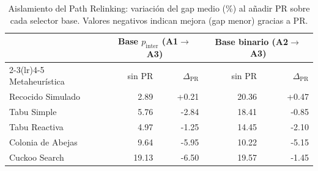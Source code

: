 \begin{table}[htbp]\centering
\caption{Aislamiento del Path Relinking: variaci\'on del gap medio (\%) al a\~nadir PR sobre cada selector base. Valores negativos indican mejora (gap menor) gracias a PR.}
\label{tab:efecto-pr}
\begin{tabular}{l rr rr}
\toprule
& \multicolumn{2}{c}{Base $p_{\text{inter}}$ (A1$\to$A3)} & \multicolumn{2}{c}{Base binario (A2$\to$A3)} \\
\cmidrule(lr){2-3}\cmidrule(lr){4-5}
Metaheur\'istica & sin PR & $\Delta_{\text{PR}}$ & sin PR & $\Delta_{\text{PR}}$ \\
\midrule
Recocido Simulado & 2.89 & +0.21 & 20.36 & +0.47 \\
Tabu Simple & 5.76 & -2.84 & 18.41 & -0.85 \\
Tabu Reactiva & 4.97 & -1.25 & 14.45 & -2.10 \\
Colonia de Abejas & 9.64 & -5.95 & 10.22 & -5.15 \\
Cuckoo Search & 19.13 & -6.50 & 19.57 & -1.45 \\
\bottomrule
\end{tabular}
\end{table}

